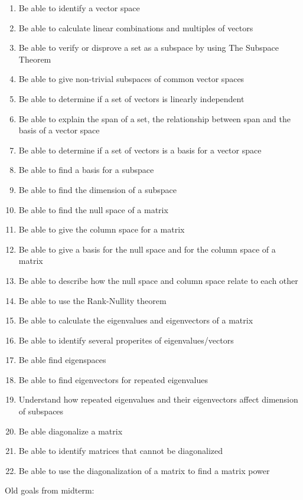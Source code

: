 \documentclass{article}
\begin{document}
\begin{flushleft}
\begin{enumerate}
\item Be able to identify a vector space
\item Be able to calculate linear combinations and multiples of vectors
\item Be able to verify or disprove a set as a subspace by using The Subspace Theorem
\item Be able to give non-trivial subspaces of common vector spaces
\item Be able to determine if a set of vectors is linearly independent
\item Be able to explain the span of a set, the relationship between span and the basis of a vector space
\item Be able to determine if a set of vectors is a basis for a vector space
\item Be able to find a basis for a subspace
\item Be able to find the dimension of a subspace
\item Be able to find the null space of a matrix
\item Be able to give the column space for a matrix
\item Be able to give a basis for the null space and for the column space of a matrix
\item Be able to describe how the null space and column space relate to each other
\item Be able to use the Rank-Nullity theorem
\item Be able to calculate the eigenvalues and eigenvectors of a matrix
\item Be able to identify several properites of eigenvalues/vectors
\item Be able find eigenspaces
\item Be able to find eigenvectors for repeated eigenvalues
\item Understand how repeated eigenvalues and their eigenvectors affect dimension of subspaces
\item Be able diagonalize a matrix
\item Be able to identify matrices that cannot be diagonalized
\item Be able to use the diagonalization of a matrix to find a matrix power
\end{enumerate}

\pagebreak

Old goals from midterm:


\end{flushleft}
\end{document}
